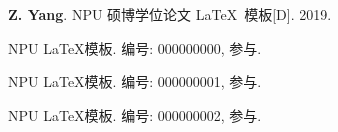 \documentclass[twoside, UTF8, phd]{nputhesis}
\theoremstyle{npuplain}
\theoremstyle{nputheorem}
\begin{document}
\backmatter
\printbibliography             %

\Appendix  %

\Thanks     %

\Work
\papersection  %

\begin{npulist}
  \item {\bf Z. Yang}. NPU 硕博学位论文 \LaTeX\ 模板[D]. 2019.
\end{npulist}

\researchsection %
\begin{npulist}
  \item NPU \LaTeX 模板.   编号: 000000000, 参与.
  \item NPU \LaTeX 模板.   编号: 000000001, 参与.
  \item NPU \LaTeX 模板.   编号: 000000002, 参与.
\end{npulist}

\statement
\end{document}
